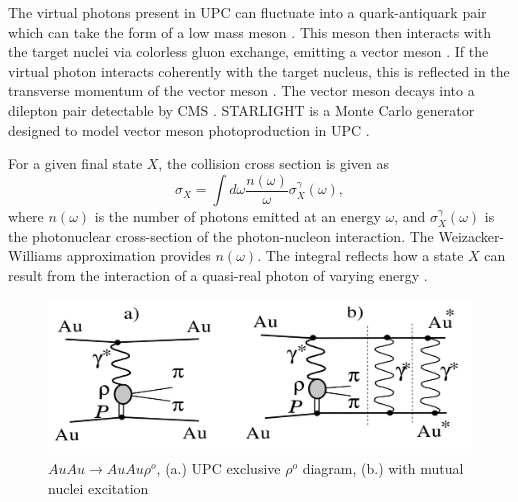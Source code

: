 The virtual photons present in UPC can fluctuate into a quark-antiquark pair which can take the form of a low mass meson \cite{lta2011.09}\cite{Chekanov:2002xi}\cite{Klasen:2007pm}. This meson then interacts with the target nuclei via colorless gluon exchange, emitting a vector meson \cite{Emling:1994gu} \cite{dePassos:2001dc} \cite{Ryskin:1992ui}\cite{Goldhaber:1948zza}. If the virtual photon interacts coherently with the target nucleus, this is reflected in the transverse momentum of the vector meson \cite{Goncalves:2011vf}. The vector meson decays into a dilepton pair detectable by CMS \cite{Lappi:2013am}\cite{Gaiser:1982yw}\cite{Aktas:2005xu}\cite{Abbas:2013oua}. STARLIGHT is a Monte Carlo generator designed to model vector meson photoproduction in UPC \cite{starlight}.

For a given final state $X$, the collision cross section is given as
\begin{equation}
\sigma_X = \int d \omega \frac{n(\omega)}{\omega} \sigma_X^\gamma(\omega),
\end{equation}
where $n(\omega)$ is the number of photons emitted at an energy $\omega$, and $\sigma_X^\gamma(\omega)$ is the photonuclear cross-section of the photon-nucleon interaction. The Weizacker-Williams approximation provides $n(\omega)$. The integral reflects how a state $X$ can result from the interaction of a quasi-real photon of varying energy \cite{Nystrand:2004vn}. 

\begin{figure}[h!]
\begin{centering}
\includegraphics[width=5.5in]{Chapter2/importfigs/upc_star_diagram.png}
\par\end{centering}
\caption{$AuAu \rightarrow AuAu\rho^o$, (a.) UPC exclusive $\rho^o$ diagram, (b.) with mutual nuclei excitation \cite{Adler:2002sc} \label{fig:upcRhoStar}}
\end{figure}

